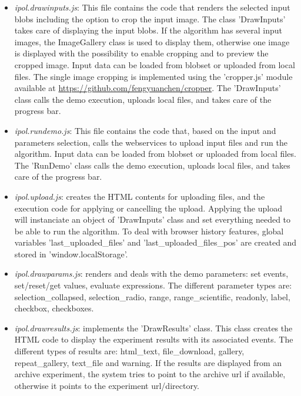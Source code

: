 \begin{itemize}
 \item \emph{ipol.drawinputs.js}: This file contains the code that renders 
  the selected input blobs including the option to crop the input image. The class
  'DrawInputs' takes care of displaying the input blobs.
  If the algorithm has several input images, the ImageGallery class is used
  to display them, otherwise one image is displayed with the possibility to 
  enable cropping and to preview the cropped image. Input data can be loaded
  from blobset or uploaded from local files. The single image cropping is
  implemented using the 'cropper.js' module available at 
  \url{https://github.com/fengyuanchen/cropper}. The 'DrawInputs' class
  calls the demo execution, uploads local files, and takes care of the progress bar.

 \item \emph{ipol.rundemo.js}: This file contains the code that, based on the 
  input and parameters selection, calls the webservices to upload input files
  and run the algorithm. Input data can be loaded
  from blobset or uploaded from local files. The 'RunDemo' class
  calls the demo execution, uploads local files, and takes care of the progress bar.

 \item \emph{ipol.upload.js}: creates the HTML contents for uploading
  files, and the execution code for applying or cancelling the upload. Applying 
  the upload will instanciate an object of 'DrawInputs' class and set everything
  needed to be able to run the algorithm. To deal with browser history features,
  global variables 'last\_uploaded\_files' and 'last\-\_up\-loaded\-\_files\-\_pos' are created
  and stored in 'window.localStorage'.

 \item \emph{ipol.drawparams.js}: renders and deals with the demo parameters:
  set events, set/reset/get values, evaluate expressions. The different parameter
  types are: selection\_collapsed,  selection\_radio,  range,  ran\-ge\-\_scien\-ti\-fic, 
  readonly,  label,  checkbox,  checkboxes.


 \item \emph{ipol.drawresults.js}: implements the 'DrawResults' class. This
  class creates the HTML code to display the experiment results with its associated
  events. The different types of results are: html\_text, file\_download,
  gallery, repeat\_gallery, text\_file and warning. If the results are displayed
  from an archive experiment, the system tries to point to the archive url if
  available, otherwise it points to the experiment url/directory.



\end{itemize}
